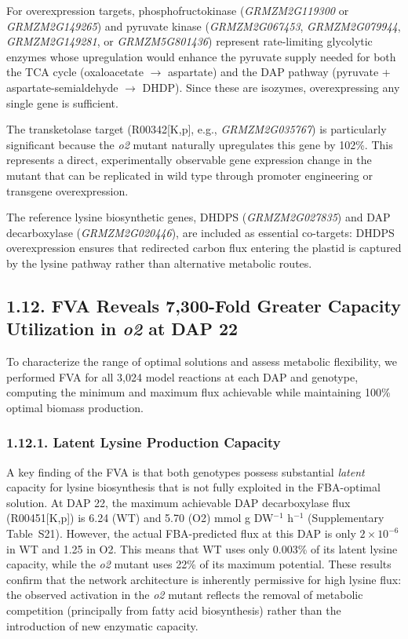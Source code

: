 \documentclass[12pt,a4paper]{article}
\begin{document}
For overexpression targets, phosphofructokinase (\textit{GRMZM2G119300} or \textit{GRMZM2G149265}) and pyruvate kinase (\textit{GRMZM2G067453}, \textit{GRMZM2G079944}, \textit{GRMZM2G149281}, or \textit{GRMZM5G801436}) represent rate-limiting glycolytic enzymes whose upregulation would enhance the pyruvate supply needed for both the TCA cycle (oxaloacetate $\rightarrow$ aspartate) and the DAP pathway (pyruvate + aspartate-semialdehyde $\rightarrow$ DHDP). Since these are isozymes, overexpressing any single gene is sufficient.

The transketolase target (R00342[K,p], e.g., \textit{GRMZM2G035767}) is particularly significant because the \textit{o2} mutant naturally upregulates this gene by 102\%. This represents a direct, experimentally observable gene expression change in the mutant that can be replicated in wild type through promoter engineering or transgene overexpression.

The reference lysine biosynthetic genes, DHDPS (\textit{GRMZM2G027835}) and DAP decarboxylase (\textit{GRMZM2G020446}), are included as essential co-targets: DHDPS overexpression ensures that redirected carbon flux entering the plastid is captured by the lysine pathway rather than alternative metabolic routes.

\subsection{1.12. FVA Reveals 7,300-Fold Greater Capacity Utilization in \textit{o2} at DAP 22}

To characterize the range of optimal solutions and assess metabolic flexibility, we performed FVA for all 3,024 model reactions at each DAP and genotype, computing the minimum and maximum flux achievable while maintaining 100\% optimal biomass production.

\subsubsection{1.12.1. Latent Lysine Production Capacity}

A key finding of the FVA is that both genotypes possess substantial \textit{latent} capacity for lysine biosynthesis that is not fully exploited in the FBA-optimal solution. At DAP 22, the maximum achievable DAP decarboxylase flux (R00451[K,p]) is 6.24 (WT) and 5.70 (O2) mmol g DW$^{-1}$ h$^{-1}$ (Supplementary Table~S21). However, the actual FBA-predicted flux at this DAP is only $2 \times 10^{-6}$ in WT and 1.25 in O2. This means that WT uses only 0.003\% of its latent lysine capacity, while the \textit{o2} mutant uses 22\% of its maximum potential. These results confirm that the network architecture is inherently permissive for high lysine flux: the observed activation in the \textit{o2} mutant reflects the removal of metabolic competition (principally from fatty acid biosynthesis) rather than the introduction of new enzymatic capacity.
\end{document}
